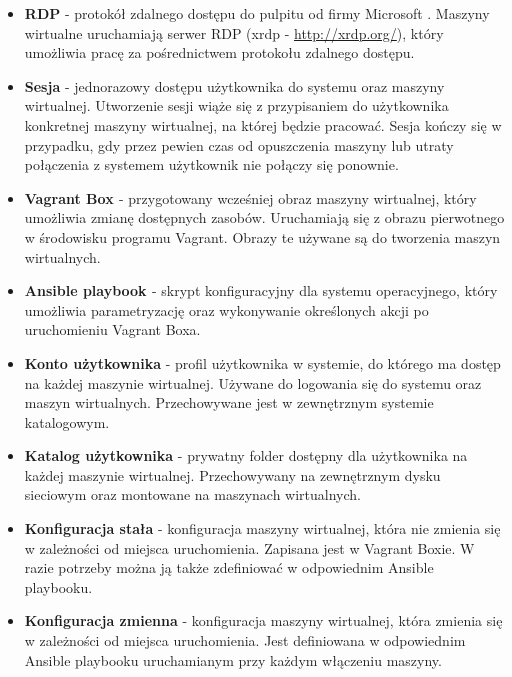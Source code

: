 \documentclass[../wstep.tex]{subfiles}
\begin{document}
\begin{itemize}
  \item \textbf{RDP} - protokół zdalnego dostępu do pulpitu od firmy Microsoft \parencite{rdp}. Maszyny wirtualne uruchamiają serwer RDP (xrdp - \url{http://xrdp.org/}), który umożliwia pracę za pośrednictwem protokołu zdalnego dostępu.
  \item \textbf{Sesja} - jednorazowy dostępu użytkownika do systemu oraz maszyny wirtualnej. Utworzenie sesji wiąże się z przypisaniem do użytkownika konkretnej maszyny wirtualnej, na której będzie pracować. Sesja kończy się w przypadku, gdy przez pewien czas od opuszczenia maszyny lub utraty połączenia z systemem użytkownik nie połączy się ponownie.
  \item \textbf{Vagrant Box \parencite{vagrantbox}} - przygotowany wcześniej obraz maszyny wirtualnej, który umożliwia zmianę dostępnych zasobów. Uruchamiają się z obrazu pierwotnego w środowisku programu Vagrant. Obrazy te używane są do tworzenia maszyn wirtualnych.
  \item \textbf{Ansible playbook \parencite{ansible-playbook}} - skrypt konfiguracyjny dla systemu operacyjnego, który umożliwia parametryzację oraz wykonywanie określonych akcji po uruchomieniu Vagrant Boxa.
  
  \item \textbf{Konto użytkownika} - profil użytkownika w systemie, do którego ma dostęp na każdej maszynie wirtualnej. Używane do logowania się do systemu oraz maszyn wirtualnych. Przechowywane jest w zewnętrznym systemie katalogowym.
  \item \textbf{Katalog użytkownika} - prywatny folder dostępny dla użytkownika na każdej maszynie wirtualnej. Przechowywany na zewnętrznym dysku sieciowym oraz montowane na maszynach wirtualnych.
  \item \textbf{Konfiguracja stała} - konfiguracja maszyny wirtualnej, która nie zmienia się w zależności od miejsca uruchomienia. Zapisana jest w Vagrant Boxie. W razie potrzeby można ją także zdefiniować w odpowiednim Ansible playbooku.
  \item \textbf{Konfiguracja zmienna} - konfiguracja maszyny wirtualnej, która zmienia się w zależności od miejsca uruchomienia. Jest definiowana w odpowiednim Ansible playbooku uruchamianym przy każdym włączeniu maszyny.
\end{itemize}
\end{document}
